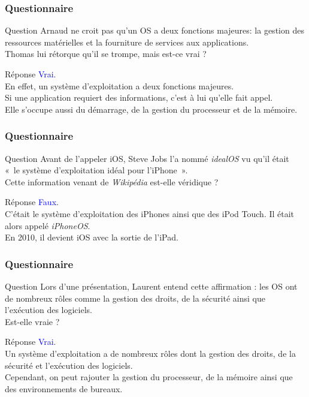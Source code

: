 \documentclass[aspectratio=169]{beamer}
\begin{document}
\begin{frame}
  \frametitle{Questionnaire}
  \begin{exampleblock}{Question}
    Arnaud ne croit pas qu’un OS a deux fonctions majeures: la gestion des
    ressources matérielles et la fourniture de services aux applications. \\
    Thomas lui rétorque qu’il se trompe, mais est-ce vrai ?
  \end{exampleblock}

  \pause

  \begin{block}{Réponse}
    \textcolor{blue}{Vrai}. \\
    En effet, un système d'exploitation a deux fonctions majeures. \\
    Si une application requiert des informations, c'est à lui qu'elle fait appel. \\
    Elle s'occupe aussi du démarrage, de la gestion du processeur et de la
    mémoire.
  \end{block}
\end{frame}

\begin{frame}
  \frametitle{Questionnaire}
  \begin{exampleblock}{Question}
    Avant de l’appeler iOS, Steve Jobs l’a nommé \textit{idealOS} vu qu’il était \\
    « le système d’exploitation idéal pour l’iPhone ». \\
    Cette information venant de \textit{Wikipédia} est-elle véridique ?
  \end{exampleblock}

  \pause

  \begin{block}{Réponse}
    \textcolor{blue}{Faux}. \\
    C'était le système d'exploitation des iPhones ainsi que des iPod Touch.
    Il était alors appelé \textit{iPhoneOS}. \\
    En 2010, il devient iOS avec la sortie de l'iPad.
  \end{block}
\end{frame}

\begin{frame}
  \frametitle{Questionnaire}
  \begin{exampleblock}{Question}
    Lors d’une présentation, Laurent entend cette affirmation : les OS ont de
    nombreux rôles comme la gestion des droits, de la sécurité ainsi que
    l’exécution des logiciels. \\
    Est-elle vraie ?
  \end{exampleblock}

  \pause

  \begin{block}{Réponse}
    \textcolor{blue}{Vrai}. \\
    Un système d'exploitation a de nombreux rôles dont la gestion des droits, de
    la sécurité et l’exécution des logiciels. \\
    Cependant, on peut rajouter la gestion du processeur, de la mémoire ainsi que des
    environnements de bureaux.
  \end{block}
\end{frame}
\end{document}
